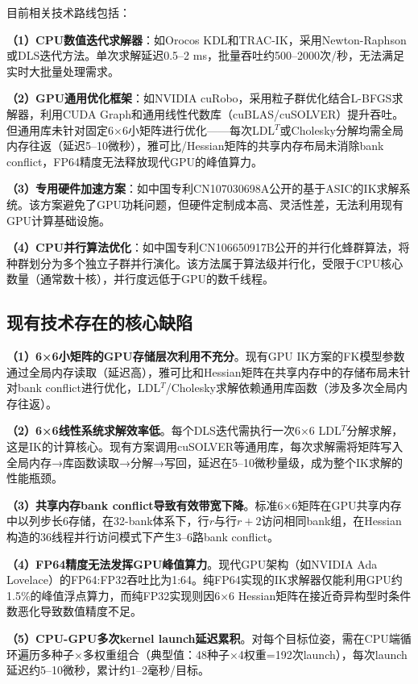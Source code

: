 \documentclass[a4paper,12pt]{ctexart}
\begin{document}
目前相关技术路线包括：

\textbf{（1）CPU数值迭代求解器}：如Orocos KDL和TRAC-IK，采用Newton-Raphson或DLS迭代方法。单次求解延迟0.5--2 ms，批量吞吐约500--2000次/秒，无法满足实时大批量处理需求。

\textbf{（2）GPU通用优化框架}：如NVIDIA cuRobo，采用粒子群优化结合L-BFGS求解器，利用CUDA Graph和通用线性代数库（cuBLAS/cuSOLVER）提升吞吐。但通用库未针对固定6×6小矩阵进行优化——每次LDL$^T$或Cholesky分解均需全局内存往返（延迟5--10微秒），雅可比/Hessian矩阵的共享内存布局未消除bank conflict，FP64精度无法释放现代GPU的峰值算力。

\textbf{（3）专用硬件加速方案}：如中国专利CN107030698A公开的基于ASIC的IK求解系统。该方案避免了GPU功耗问题，但硬件定制成本高、灵活性差，无法利用现有GPU计算基础设施。

\textbf{（4）CPU并行算法优化}：如中国专利CN106650917B公开的并行化蜂群算法，将种群划分为多个独立子群并行演化。该方法属于算法级并行化，受限于CPU核心数量（通常数十核），并行度远低于GPU的数千线程。

\subsection{现有技术存在的核心缺陷}

\textbf{（1）6×6小矩阵的GPU存储层次利用不充分}。现有GPU IK方案的FK模型参数通过全局内存读取（延迟高），雅可比和Hessian矩阵在共享内存中的存储布局未针对bank conflict进行优化，LDL$^T$/Cholesky求解依赖通用库函数（涉及多次全局内存往返）。

\textbf{（2）6×6线性系统求解效率低}。每个DLS迭代需执行一次6×6 LDL$^T$分解求解，这是IK的计算核心。现有方案调用cuSOLVER等通用库，每次求解需将矩阵写入全局内存→库函数读取→分解→写回，延迟在5--10微秒量级，成为整个IK求解的性能瓶颈。

\textbf{（3）共享内存bank conflict导致有效带宽下降}。标准6×6矩阵在GPU共享内存中以列步长6存储，在32-bank体系下，行$r$与行$r+2$访问相同bank组，在Hessian构造的36线程并行访问模式下产生3--6路bank conflict。

\textbf{（4）FP64精度无法发挥GPU峰值算力}。现代GPU架构（如NVIDIA Ada Lovelace）的FP64:FP32吞吐比为1:64。纯FP64实现的IK求解器仅能利用GPU约1.5\%的峰值浮点算力，而纯FP32实现则因6×6 Hessian矩阵在接近奇异构型时条件数恶化导致数值精度不足。

\textbf{（5）CPU-GPU多次kernel launch延迟累积}。对每个目标位姿，需在CPU端循环遍历多种子×多权重组合（典型值：48种子×4权重=192次launch），每次launch延迟约5--10微秒，累计约1--2毫秒/目标。
\end{document}
